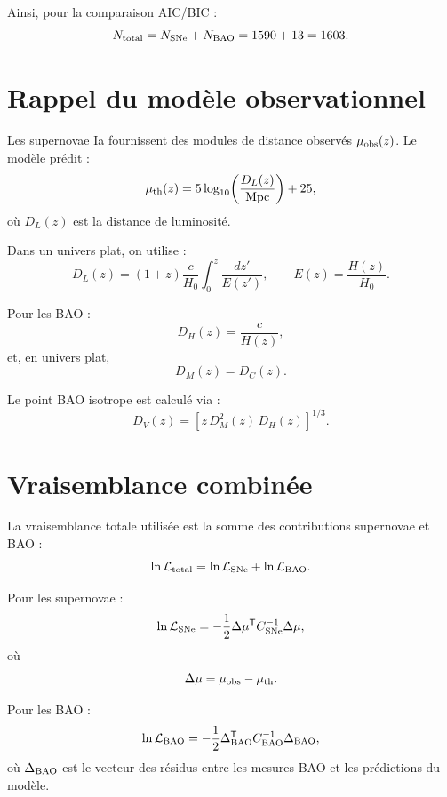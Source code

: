\documentclass[11pt]{article}
\begin{document}
Ainsi, pour la comparaison AIC/BIC :
\[
    N_{\rm total} = N_{\rm SNe} + N_{\rm BAO} = 1590 + 13 = 1603.
\]

\section{Rappel du modèle observationnel}

Les supernovae Ia fournissent des modules de distance observés $\mu_{\rm obs}(z)$. Le modèle prédit :
\begin{equation}
    \mu_{\rm th}(z)=5\log_{10}\!\left(\frac{D_L(z)}{\mathrm{Mpc}}\right)+25,
\end{equation}
où $D_L(z)$ est la distance de luminosité.

Dans un univers plat, on utilise :
\begin{equation}
    D_L(z) = (1+z)\frac{c}{H_0}\int_0^z \frac{dz'}{E(z')},
    \qquad
    E(z)=\frac{H(z)}{H_0}.
\end{equation}

Pour les BAO :
\begin{equation}
    D_H(z)=\frac{c}{H(z)},
\end{equation}
et, en univers plat,
\begin{equation}
    D_M(z)=D_C(z).
\end{equation}

Le point BAO isotrope est calculé via :
\begin{equation}
    D_V(z)=\left[z\,D_M^2(z)\,D_H(z)\right]^{1/3}.
\end{equation}

\section{Vraisemblance combinée}

La vraisemblance totale utilisée est la somme des contributions supernovae et BAO :
\begin{equation}
    \ln \mathcal{L}_{\rm total}=\ln \mathcal{L}_{\rm SNe}+\ln \mathcal{L}_{\rm BAO}.
\end{equation}

Pour les supernovae :
\begin{equation}
    \ln \mathcal{L}_{\rm SNe}=-\frac{1}{2}\Delta\mu^{\mathsf T} C_{\rm SNe}^{-1}\Delta\mu,
\end{equation}
où
\[
    \Delta\mu=\mu_{\rm obs}-\mu_{\rm th}.
\]

Pour les BAO :
\begin{equation}
    \ln \mathcal{L}_{\rm BAO}=-\frac{1}{2}\Delta_{\rm BAO}^{\mathsf T}C_{\rm BAO}^{-1}\Delta_{\rm BAO},
\end{equation}
où $\Delta_{\rm BAO}$ est le vecteur des résidus entre les mesures BAO et les prédictions du modèle.
\end{document}
